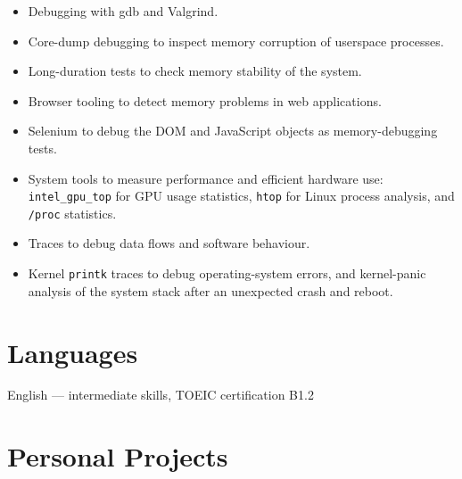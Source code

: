 \documentclass[11pt,a4paper]{article}
\begin{document}
\begin{itemize}
  \item Debugging with gdb and Valgrind.
  \item Core-dump debugging to inspect memory corruption of userspace processes.
  \item Long-duration tests to check memory stability of the system.
  \item Browser tooling to detect memory problems in web applications.
  \item Selenium to debug the DOM and JavaScript objects as memory-debugging tests.
  \item System tools to measure performance and efficient hardware use: \texttt{intel\_gpu\_top} for GPU usage statistics, \texttt{htop} for Linux process analysis, and \texttt{/proc} statistics.
  \item Traces to debug data flows and software behaviour.
  \item Kernel \texttt{printk} traces to debug operating-system errors, and kernel-panic analysis of the system stack after an unexpected crash and reboot.
\end{itemize}

\section{Languages}

English --- intermediate skills, TOEIC certification B1.2

\section{Personal Projects}
\end{document}

